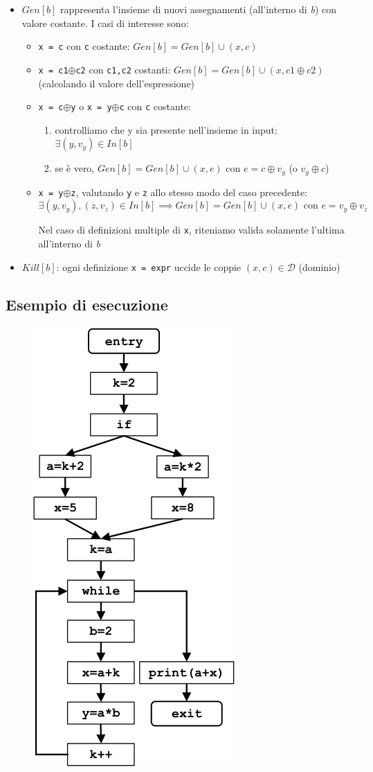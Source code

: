\documentclass[10pt,a4paper]{article}
\begin{document}
\begin{itemize}
  \item $Gen[b]$ rappresenta l'insieme di nuovi assegnamenti (all'interno di \textit{b}) con valore costante. I casi di interesse sono:
\begin{itemize}
  \item \lstinline|x = c| con \lstinline|c| costante: $Gen[b] = Gen[b] \cup (x,c)$
  \item \lstinline|x = c1|$\oplus$\lstinline|c2| con \lstinline|c1,c2| costanti: $Gen[b] = Gen[b] \cup (x,c1\oplus c2)$ (calcolando il valore dell'espressione)
  \item \lstinline|x = c|$\oplus$\lstinline|y| o \lstinline|x = y|$\oplus$\lstinline|c| con \lstinline|c| costante:
\begin{enumerate}
  \item controlliamo che y sia presente nell'insieme in input: $\exists (y,v_{y}) \in In[b]$
  \item se \`e vero, $Gen[b] = Gen[b] \cup (x,e)$ con $e = c\oplus v_{y}$ (o $v_{y}\oplus c$)
\end{enumerate}
\item \lstinline|x = y|$\oplus$\lstinline|z|, valutando \lstinline|y| e \lstinline|z| allo stesso modo del caso precedente:
  \begin{equation*}
    \exists (y,v_{y}), (z,v_{z})\in In[b] \implies Gen[b] = Gen[b] \cup (x,e) \text{~con~} e=v_{y}\oplus v_{z}
  \end{equation*}

\begin{mdframed}
  Nel caso di definizioni multiple di \lstinline|x|, riteniamo valida solamente l'ultima all'interno di \textit{b}
\end{mdframed}
\end{itemize}
\item $Kill[b]$: ogni definizione \lstinline|x = expr| uccide le coppie $(x,c)\in \mathcal{D}$ (dominio)
\end{itemize}

\subsection{Esempio di esecuzione}

\begin{figure}[h!]
  \centering
  \includegraphics[width=.3\textwidth]{example-3.png}
\end{figure}
\end{document}
